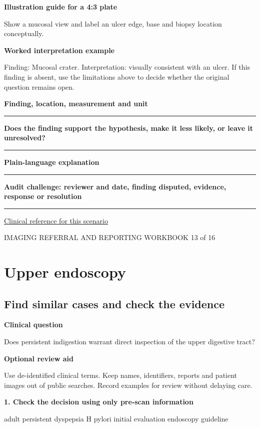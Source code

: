 \documentclass[11pt,a4paper]{article}
\newcommand{\record}[1]{\textbf{#1}\par\vspace{0.55\baselineskip}\hrule\vspace{0.35\baselineskip}}
\begin{document}
\textbf{Illustration guide for a 4:3 plate}\par Show a mucosal view and label an ulcer edge, base and biopsy location conceptually.\par

\textbf{Worked interpretation example}\par Finding: Mucosal crater. Interpretation: visually consistent with an ulcer. If this finding is absent, use the limitations above to decide whether the original question remains open.\par

\record{Finding, location, measurement and unit}

\record{Does the finding support the hypothesis, make it less likely, or leave it unresolved?}

\record{Plain-language explanation}

\record{Audit challenge: reviewer and date, finding disputed, evidence, response or resolution}

\small\href{https://gi.org/guideline/management-of-dyspepsia}{Clinical reference for this scenario}

\normalsize

\newpage

{\small IMAGING REFERRAL AND REPORTING WORKBOOK \hfill 13 of 16}

\section*{Upper endoscopy}

\subsection*{Find similar cases and check the evidence}

\textbf{Clinical question}\par Does persistent indigestion warrant direct inspection of the upper digestive tract?\par

\textbf{Optional review aid}\par Use de-identified clinical terms. Keep names, identifiers, reports and patient images out of public searches. Record examples for review without delaying care.\par

\textbf{1. Check the decision using only pre-scan information}\par adult persistent dyspepsia H pylori initial evaluation endoscopy guideline\par
\end{document}
